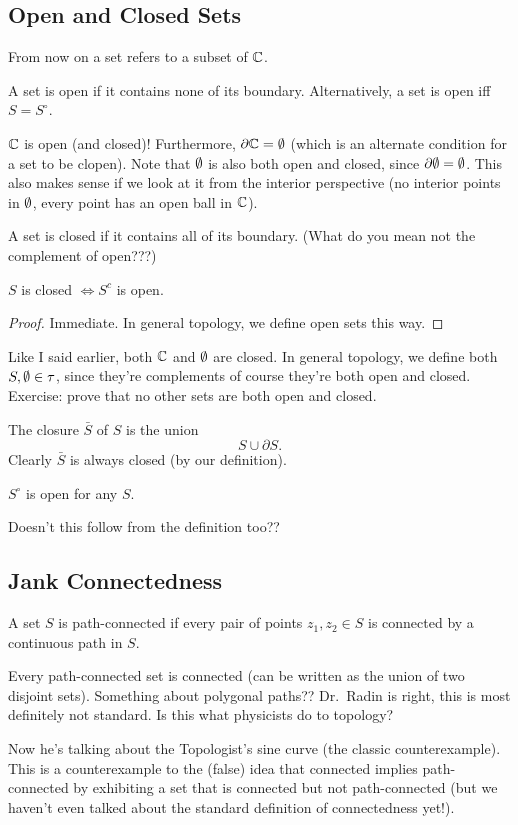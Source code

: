 \subsection{Open and Closed Sets}
From now on a set refers to a subset of $\mathbb{C}$.
\begin{definition}
    A set is open if it contains none of its boundary. Alternatively, a set is open iff  $S=S^{\circ}$.
\end{definition}
\begin{example}
    $\mathbb{C}$ is open (and closed)! Furthermore, $\partial \mathbb{C}=\emptyset$ (which is an alternate condition for a set to be clopen). Note that $\emptyset$ is also both open and closed, since $\partial \emptyset = \emptyset$. This also makes sense if we look at it from the interior perspective (no interior points in $\emptyset$, every point has an open ball in $\mathbb{C}$).
\end{example}
\begin{definition}
    A set is closed if it contains all of its boundary. (What do you mean not the complement of open???) 
\end{definition}
\begin{theorem}
    $S$ is closed $\iff S^{c}$ is open.
\end{theorem}
\begin{proof}
    Immediate. In general topology, we define open sets this way.
\end{proof}
\begin{example}
    Like I said earlier, both $\mathbb{C}$ and $\emptyset$ are closed. In general topology, we define both $S, \emptyset \in \tau$, since they're complements of course they're both open and closed. Exercise: prove that no other sets are both open and closed.
\end{example}
\begin{definition}[Closure]
    The closure $\bar{S}$ of $S$ is the union \[
    S \cup \partial S.
    \]
    Clearly $\bar{S}$ is always closed (by our definition).
\end{definition}
\begin{theorem}
    $S^{\circ}$ is open for any $S$.
\end{theorem}
Doesn't this follow from the definition too??

\subsection{Jank Connectedness}
\begin{definition}
    A set  $S$ is path-connected if every pair of points $z_1,z_2\in S$ is connected by a continuous path in $S$. 
\end{definition}
Every path-connected set is connected (can be written as the union of two disjoint sets). Something about polygonal paths?? Dr.\ Radin is right, this is most definitely not standard. Is this what physicists do to topology?

Now he's talking about the Topologist's sine curve (the classic counterexample). This is a counterexample to the (false) idea that connected implies path-connected  by exhibiting a set that is connected but not path-connected (but we haven't even talked about the standard definition of connectedness yet!).
